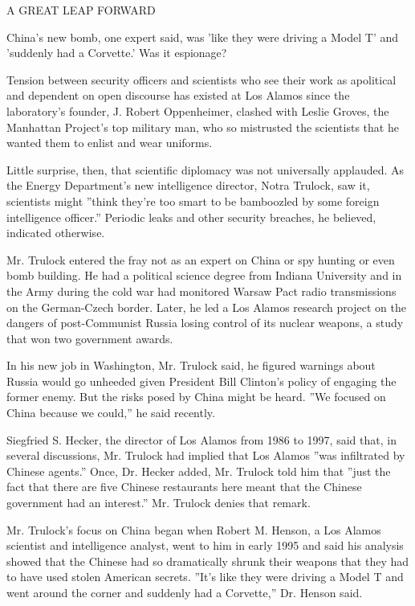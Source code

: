 A GREAT LEAP FORWARD

China's new bomb, one expert said, was 'like they were driving a Model
T' and 'suddenly had a Corvette.' Was it espionage?

Tension between security officers and scientists who see their work as
apolitical and dependent on open discourse has existed at Los Alamos
since the laboratory's founder, J. Robert Oppenheimer, clashed with
Leslie Groves, the Manhattan Project's top military man, who so
mistrusted the scientists that he wanted them to enlist and wear
uniforms.

Little surprise, then, that scientific diplomacy was not universally
applauded. As the Energy Department's new intelligence director, Notra
Trulock, saw it, scientists might ''think they're too smart to be
bamboozled by some foreign intelligence officer.'' Periodic leaks and
other security breaches, he believed, indicated otherwise.

Mr. Trulock entered the fray not as an expert on China or spy hunting or
even bomb building. He had a political science degree from Indiana
University and in the Army during the cold war had monitored Warsaw Pact
radio transmissions on the German-Czech border. Later, he led a Los
Alamos research project on the dangers of post-Communist Russia losing
control of its nuclear weapons, a study that won two government awards.

In his new job in Washington, Mr. Trulock said, he figured warnings
about Russia would go unheeded given President Bill Clinton's policy of
engaging the former enemy. But the risks posed by China might be heard.
''We focused on China because we could,'' he said recently.

Siegfried S. Hecker, the director of Los Alamos from 1986 to 1997, said
that, in several discussions, Mr. Trulock had implied that Los Alamos
''was infiltrated by Chinese agents.'' Once, Dr. Hecker added, Mr.
Trulock told him that ''just the fact that there are five Chinese
restaurants here meant that the Chinese government had an interest.''
Mr. Trulock denies that remark.

Mr. Trulock's focus on China began when Robert M. Henson, a Los Alamos
scientist and intelligence analyst, went to him in early 1995 and said
his analysis showed that the Chinese had so dramatically shrunk their
weapons that they had to have used stolen American secrets. ''It's like
they were driving a Model T and went around the corner and suddenly had
a Corvette,'' Dr. Henson said.


